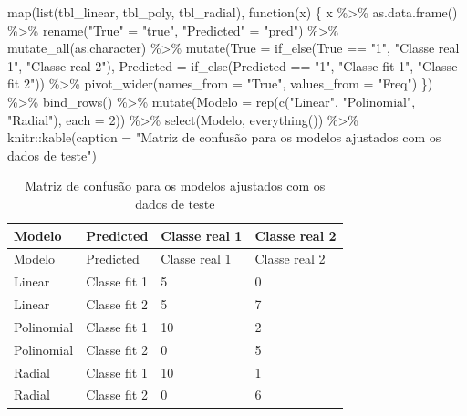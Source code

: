 \documentclass[
  a4paperpaper,
]{article}
\newenvironment{Shaded}{\begin{snugshade}}{\end{snugshade}}
\newcommand{\AttributeTok}[1]{\textcolor[rgb]{0.40,0.45,0.13}{#1}}
\newcommand{\ControlFlowTok}[1]{\textcolor[rgb]{0.00,0.23,0.31}{#1}}
\newcommand{\DecValTok}[1]{\textcolor[rgb]{0.68,0.00,0.00}{#1}}
\newcommand{\FunctionTok}[1]{\textcolor[rgb]{0.28,0.35,0.67}{#1}}
\newcommand{\NormalTok}[1]{\textcolor[rgb]{0.00,0.23,0.31}{#1}}
\newcommand{\OtherTok}[1]{\textcolor[rgb]{0.00,0.23,0.31}{#1}}
\newcommand{\SpecialCharTok}[1]{\textcolor[rgb]{0.37,0.37,0.37}{#1}}
\newcommand{\StringTok}[1]{\textcolor[rgb]{0.13,0.47,0.30}{#1}}
\begin{document}
\begin{Shaded}
\begin{Highlighting}[]
\FunctionTok{map}\NormalTok{(}\FunctionTok{list}\NormalTok{(tbl\_linear, tbl\_poly, tbl\_radial), }\ControlFlowTok{function}\NormalTok{(x) \{}
\NormalTok{  x }\SpecialCharTok{\%\textgreater{}\%}
    \FunctionTok{as.data.frame}\NormalTok{() }\SpecialCharTok{\%\textgreater{}\%}
    \FunctionTok{rename}\NormalTok{(}\StringTok{"True"} \OtherTok{=} \StringTok{"true"}\NormalTok{, }\StringTok{"Predicted"} \OtherTok{=} \StringTok{"pred"}\NormalTok{) }\SpecialCharTok{\%\textgreater{}\%}
    \FunctionTok{mutate\_all}\NormalTok{(as.character) }\SpecialCharTok{\%\textgreater{}\%}
    \FunctionTok{mutate}\NormalTok{(}\AttributeTok{True =} \FunctionTok{if\_else}\NormalTok{(True }\SpecialCharTok{==} \StringTok{"1"}\NormalTok{, }\StringTok{"Classe real 1"}\NormalTok{, }\StringTok{"Classe real 2"}\NormalTok{),}
           \AttributeTok{Predicted =} \FunctionTok{if\_else}\NormalTok{(Predicted }\SpecialCharTok{==} \StringTok{"1"}\NormalTok{, }\StringTok{"Classe fit 1"}\NormalTok{, }\StringTok{"Classe fit 2"}\NormalTok{)) }\SpecialCharTok{\%\textgreater{}\%}
    \FunctionTok{pivot\_wider}\NormalTok{(}\AttributeTok{names\_from =} \StringTok{"True"}\NormalTok{, }\AttributeTok{values\_from =} \StringTok{"Freq"}\NormalTok{)}
\NormalTok{\}) }\SpecialCharTok{\%\textgreater{}\%}
  \FunctionTok{bind\_rows}\NormalTok{() }\SpecialCharTok{\%\textgreater{}\%}
  \FunctionTok{mutate}\NormalTok{(}\AttributeTok{Modelo =} \FunctionTok{rep}\NormalTok{(}\FunctionTok{c}\NormalTok{(}\StringTok{"Linear"}\NormalTok{, }\StringTok{"Polinomial"}\NormalTok{, }\StringTok{"Radial"}\NormalTok{), }\AttributeTok{each =} \DecValTok{2}\NormalTok{)) }\SpecialCharTok{\%\textgreater{}\%}
  \FunctionTok{select}\NormalTok{(Modelo, }\FunctionTok{everything}\NormalTok{()) }\SpecialCharTok{\%\textgreater{}\%}
\NormalTok{  knitr}\SpecialCharTok{::}\FunctionTok{kable}\NormalTok{(}\AttributeTok{caption =} \StringTok{"Matriz de confusão para os modelos ajustados com os dados de teste"}\NormalTok{)}
\end{Highlighting}
\end{Shaded}

\begin{longtable}[]{@{}llll@{}}
\caption{Matriz de confusão para os modelos ajustados com os dados de
teste}\tabularnewline
\toprule\noalign{}
Modelo & Predicted & Classe real 1 & Classe real 2 \\
\midrule\noalign{}
\endfirsthead
\toprule\noalign{}
Modelo & Predicted & Classe real 1 & Classe real 2 \\
\midrule\noalign{}
\endhead
\bottomrule\noalign{}
\endlastfoot
Linear & Classe fit 1 & 5 & 0 \\
Linear & Classe fit 2 & 5 & 7 \\
Polinomial & Classe fit 1 & 10 & 2 \\
Polinomial & Classe fit 2 & 0 & 5 \\
Radial & Classe fit 1 & 10 & 1 \\
Radial & Classe fit 2 & 0 & 6 \\
\end{longtable}
\end{document}
